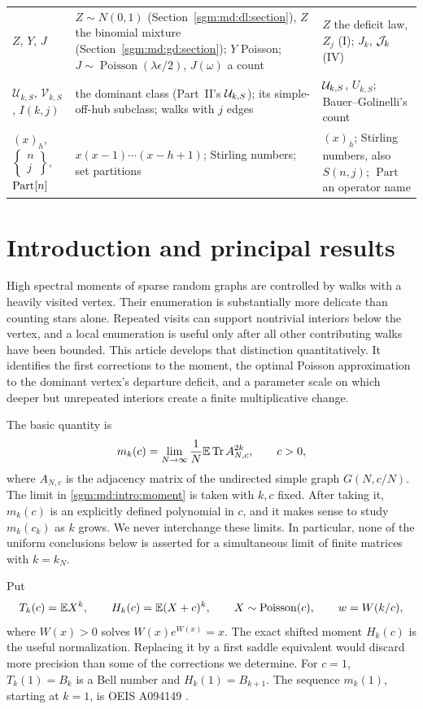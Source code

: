 \documentclass[11pt,letterpaper]{article}
\theoremstyle{remark}\newtheorem{remark}[theorem]{Remark}
\newcommand{\Poi}{\operatorname{Poisson}}\newcommand{\Bin}{\operatorname{Bin}}
\newcommand{\fall}[2]{(#1)_{#2}}\newcommand{\rise}[2]{#1^{\overline{#2}}}
\newcommand{\Stir}[2]{\left\{\begin{matrix}#1\\#2\end{matrix}\right\}}
\theoremstyle{definition}\newtheorem{definition}[theorem]{Definition}
\begin{document}
\begin{longtable}{@{}>{\raggedright\arraybackslash}p{0.95in}>{\raggedright\arraybackslash}p{3.0in}>{\raggedright\arraybackslash}p{2.2in}@{}}
$Z$, $Y$, $J$ & $Z\sim N(0,1)$ (Section~\ref{sgm:md:dl:section}), $Z$ the binomial mixture (Section~\ref{sgm:md:gd:section}); $Y$ Poisson; $J\sim\Poi(\lambda\epsilon/2)$, $J(\omega)$ a count & $Z$ the deficit law, $Z_j$ (I); $J_k$, $\mathcal J_k$ (IV)\\
$\mathcal U_{k,S}$, $\mathcal V_{k,S}$, $I(k,j)$ & the dominant class (Part~II's $\mathcal U_{k,S}$); its simple-off-hub subclass; walks with $j$ edges & $\mathcal U_{k,S}$, $U_{k,S}$; Bauer--Golinelli's count\\
$\fall xh$, $\Stir nj$, $\operatorname{Part}[n]$ & $x(x-1)\cdots(x-h+1)$; Stirling numbers; set partitions & $(x)_h$; Stirling numbers, also $S(n,j)$; $\operatorname{Part}$ an operator name\\
\bottomrule
\end{longtable}
\addtocounter{table}{-1}%
\endgroup

\section{Introduction and principal results}
\label{sgm:md:sec:introduction}

High spectral moments of sparse random graphs are controlled by
walks with a heavily visited vertex. Their enumeration is substantially
more delicate than counting stars alone. Repeated visits can support
nontrivial interiors below the vertex, and a local enumeration is useful
only after all other contributing walks have been bounded. This article
develops that distinction quantitatively. It identifies the first
corrections to the moment, the optimal Poisson approximation to the
dominant vertex's departure deficit, and a parameter scale on which
deeper but unrepeated interiors create a finite multiplicative change.

The basic quantity is
\begin{equation}\label{sgm:md:intro:moment}
 m_k(c)=\lim_{N\to\infty}\frac1N\mathbb E\operatorname{Tr}A_{N,c}^{2k},
 \qquad c>0,
\end{equation}
where $A_{N,c}$ is the adjacency matrix of the undirected simple graph
$G(N,c/N)$. The limit in \eqref{sgm:md:intro:moment} is taken with $k,c$ fixed.
After taking it, $m_k(c)$ is an explicitly defined polynomial in $c$,
and it makes sense to study $m_k(c_k)$ as $k$ grows. We never interchange
these limits. In particular, none of the uniform conclusions below is
asserted for a simultaneous limit of finite matrices with $k=k_N$.

Put
\begin{equation}\label{sgm:md:intro:normalizers}
 T_k(c)=\E X^k,\qquad H_k(c)=\E(X+c)^k,\qquad
 X\sim\Poi(c),\qquad w=W(k/c),
\end{equation}
where $W(x)>0$ solves $W(x)e^{W(x)}=x$. The exact shifted moment $H_k(c)$
is the useful normalization. Replacing it by a first saddle equivalent
would discard more precision than some of the corrections we determine.
For $c=1$, $T_k(1)=B_k$ is a Bell number and $H_k(1)=B_{k+1}$.
The sequence $m_k(1)$, starting at $k=1$, is OEIS A094149
\cite{oeis}.
\end{document}
